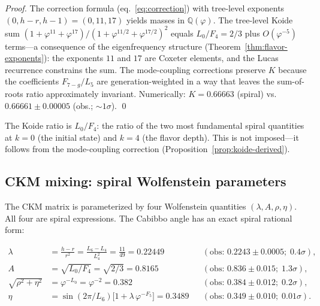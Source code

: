 \documentclass[12pt,a4paper]{article}
\begin{document}
\begin{proof}
The correction formula (eq.~\ref{eq:correction}) with tree-level exponents $(0, h{-}r, h{-}1) = (0, 11, 17)$ yields masses in $\mathbb{Q}(\varphi)$. The tree-level Koide sum $(1 + \varphi^{11} + \varphi^{17}) / (1 + \varphi^{11/2} + \varphi^{17/2})^2$ equals $L_0/F_4 = 2/3$ plus $O(\varphi^{-5})$ terms---a consequence of the eigenfrequency structure (Theorem~\ref{thm:flavor-exponents}): the exponents $11$ and $17$ are Coxeter elements, and the Lucas recurrence constrains the sum. The mode-coupling corrections preserve $K$ because the coefficients $F_{7-g}/L_5$ are generation-weighted in a way that leaves the sum-of-roots ratio approximately invariant. Numerically: $K = 0.66663$ (spiral) vs.\ $0.66661 \pm 0.00005$ (obs.; ${\sim}1\sigma$). \qed
\end{proof}

\noindent The Koide ratio is $L_0/F_4$: the ratio of the two most fundamental spiral quantities at $k = 0$ (the initial state) and $k = 4$ (the flavor depth). This is not imposed---it follows from the mode-coupling correction (Proposition~\ref{prop:koide-derived}).

\subsection{CKM mixing: spiral Wolfenstein parameters}
\label{sec:ckm}

The CKM matrix is parameterized by four Wolfenstein quantities $(\lambda, A, \rho, \eta)$. All four are spiral expressions. The Cabibbo angle has an exact spiral rational form:

\begin{align}
\lambda &= \frac{h - r}{r^2} = \frac{L_6 - L_4}{L_4^2} = \frac{11}{49} = 0.22449 && (\text{obs: } 0.2243 \pm 0.0005;\; 0.4\sigma), \label{eq:cabibbo}\\
A &= \sqrt{L_0/F_4} = \sqrt{2/3} = 0.8165 && (\text{obs: } 0.836 \pm 0.015;\; 1.3\sigma), \label{eq:wolfA}\\
\sqrt{\rho^2{+}\eta^2} &= \varphi^{-L_0} = \varphi^{-2} = 0.382 && (\text{obs: } 0.384 \pm 0.012;\; 0.2\sigma), \\
\eta &= \sin(2\pi/L_6)\bigl[1 + \lambda\,\varphi^{-F_5}\bigr] = 0.3489 && (\text{obs: } 0.349 \pm 0.010;\; 0.01\sigma). \label{eq:eta}
\end{align}
\end{document}

